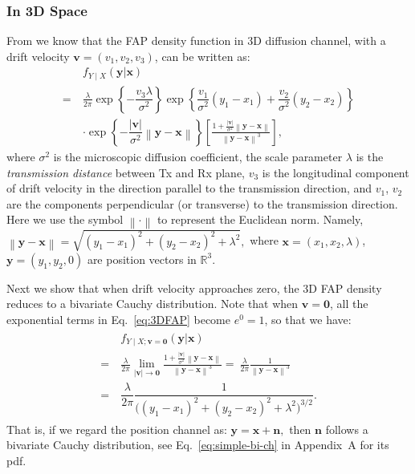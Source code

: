 \documentclass[conference]{IEEEtran}
\newcommand{\R}{\mathbb{R}}
\theoremstyle{definition}
\theoremstyle{plain}
\newcommand{\norm}[1]{\left\lVert#1\right\rVert}
\begin{document}
\subsubsection{In 3D Space}
From \cite{lee2022arrival,lee2016distribution} we know that
the FAP density function in 3D diffusion channel, with a drift velocity $\mathbf{v}=(v_1,v_2,v_3)$, can be written as:
\begin{equation}
\begin{aligned}
&f_{Y \mid X}(\mathbf{y}|\mathbf{x})\\
=\ & \frac{\lambda}{2 \pi} \exp \left\{-\dfrac{v_{3} \lambda}{\sigma^2}\right\} \exp \left\{\dfrac{v_{1}}{\sigma^2}\left(y_1-x_1\right)+\dfrac{v_{2}}{\sigma^2}\left(y_2-x_2\right)\right\} \\
& \cdot \exp \left\{-\dfrac{|\mathbf{v}|}{\sigma^2}\norm{\mathbf{y}-\mathbf{x}}\right\}\left[\frac{1+\frac{|\mathbf{v}|}{\sigma^2}\norm{\mathbf{y}-\mathbf{x}}}{\norm{\mathbf{y}-\mathbf{x}}^{3}}\right],
\end{aligned}
\label{eq:3DFAP}
\end{equation}
where $\sigma^2$ is the microscopic diffusion coefficient, the scale parameter $\lambda$ is the \textit{transmission distance} between Tx and Rx plane, $v_3$ is the longitudinal component of drift velocity in the direction parallel to the transmission direction, and $v_1$, $v_2$ are the components perpendicular (or transverse) to the transmission direction. Here we use the symbol $\norm{\cdot}$ to represent the Euclidean norm. Namely,
$
\norm{\mathbf{y}-\mathbf{x}}=\sqrt{(y_1-x_1)^2+(y_2-x_2)^2+\lambda^2},
$
where $\mathbf{x}=(x_1,x_2,\lambda)$, $\mathbf{y}=(y_1,y_2,0)$ are position vectors in $\R^3$.

Next we show that when drift velocity approaches zero, the 3D FAP density reduces to a bivariate Cauchy distribution.
Note that when $\mathbf{v}=\mathbf{0}$, all the exponential terms in Eq.~\eqref{eq:3DFAP} become $e^0=1$,
so that we have:
\begin{align}
\begin{split}
&\ f_{Y \mid X;\mathbf{v}=\mathbf{0}}(\mathbf{y}|\mathbf{x})\\
=&\ 
\frac{\lambda}{2 \pi}
\lim_{|\mathbf{v}|\xrightarrow{}\mathbf{0}}
\frac{1+\frac{|\mathbf{v}|}{\sigma^2}\norm{\mathbf{y}-\mathbf{x}}}{\norm{\mathbf{y}-\mathbf{x}}^{3}}
=\
\frac{\lambda}{2 \pi}
\frac{1}{\norm{\mathbf{y}-\mathbf{x}}^{3}}\\
=&\
\dfrac{\lambda}{2\pi}
\dfrac{1}{
\big((y_1-x_1)^2+(y_2-x_2)^2+\lambda^2\big)^{3/2}
}.
\end{split}
\end{align}
That is, if we regard the position channel as:
$
\mathbf{y}=\mathbf{x}+\mathbf{n},
$
then $\mathbf{n}$ follows a bivariate Cauchy distribution, see Eq.~\eqref{eq:simple-bi-ch} in Appendix~A for its pdf.
\color{black}
\end{document}
